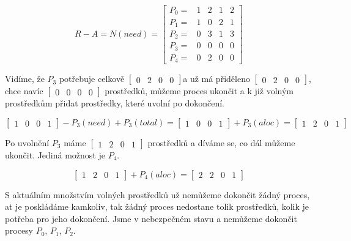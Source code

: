 $$
R - A = N (need) = 
\left[ \begin{array}{ccccc}
P_0=&1&2&1&2 \\
P_1=&1&0&2&1 \\ 
P_2=&0&3&1&3 \\ 
P_3=&0&0&0&0 \\ 
P_4=&0&2&0&0
\end{array} \right]$$

Vidíme, že $P_3$ potřebuje celkově $\left[ \begin{array}{cccc} 0&2&0&0 \end{array} \right]$a už má přiděleno $\left[ \begin{array}{cccc} 0&2&0&0 \end{array} \right]$, chce 
navíc $\left[ \begin{array}{cccc} 0&0&0&0 \end{array} \right]$ prostředků, můžeme proces ukončit a k již volným prostředkům přidat prostředky, které uvolní po dokončení.

$$
\left[ \begin{array}{cccc} 1&0&0&1 \end{array} \right]
- P_3 (need) + P_3 (total) =
\left[ \begin{array}{cccc} 1&0&0&1 \end{array} \right]
+ P_3 (aloc) =
\left[ \begin{array}{cccc} 1&2&0&1 \end{array} \right]
$$

Po uvolnění $P_3$ máme 
$\left[ \begin{array}{cccc} 1&2&0&1 \end{array} \right]$ prostředků a díváme se, co dál můžeme ukončit. Jediná možnost je $P_4$.

$$
\left[ \begin{array}{cccc} 1&2&0&1 \end{array} \right]
+ P_4 (aloc) =
\left[ \begin{array}{cccc} 2&2&0&1 \end{array} \right]
$$

S aktuálním množstvím volných prostředků už nemůžeme dokončit žádný proces, at je poskládáme kamkoliv, tak žádný proces nedostane tolik prostředků, kolik je potřeba pro jeho dokončení.
Jsme v nebezpečném stavu a nemůžeme dokončit procesy $P_0$, $P_1$, $P_2$.

\pagebreak